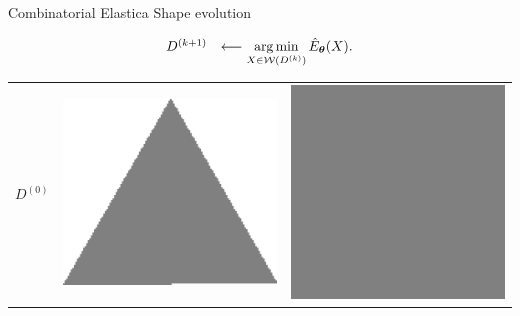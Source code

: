 \begin{frame}
	{Combinatorial Elastica}	
	{Shape evolution}

\[
\begin{array}{ll}
D^{(k+1)} &\longleftarrow \displaystyle \operatorname*{arg\,min}_{X \in \mathcal{W}(D^{(k)})}\hat{E}_{\bm{\theta}}(X).
\end{array}
\]	
	
\begin{center}
\begin{tabular}{ccc}
\multirow{4}{*}{$D^{(0)}$} & 
\includegraphics[scale=0.015]{figures/combinatorial-elastica/shapes/triangle.png}&
\includegraphics[scale=0.015]{figures/combinatorial-elastica/shapes/square.png}\\

\end{tabular}
\end{center}
\end{frame}
